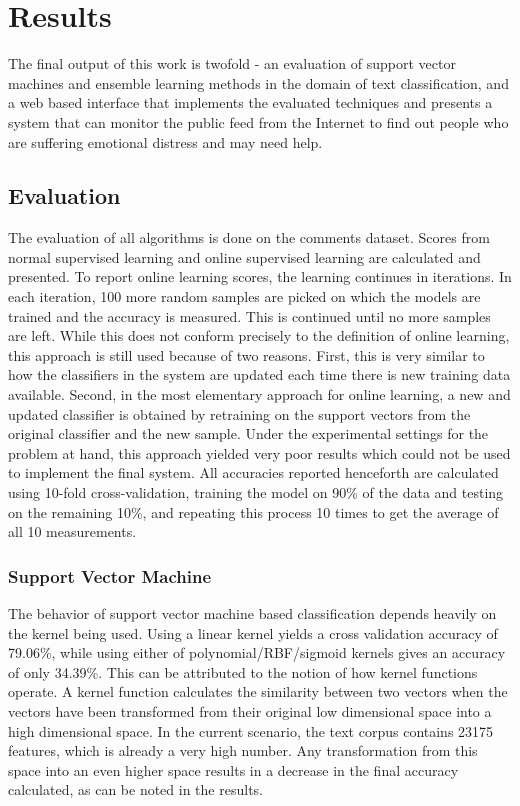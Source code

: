 \chapter{Results}
\label{chapter:Results}

The final output of this work is twofold - an evaluation of support vector machines and ensemble learning methods in the domain of text classification, and a web based interface that implements the evaluated techniques and presents a system that can monitor the public feed from the Internet to find out people who are suffering emotional distress and may need help.

\section{Evaluation}
\label{section:evaluation}
The evaluation of all algorithms is done on the comments dataset. Scores from normal supervised learning and online supervised learning are calculated and presented. To report online learning scores, the learning continues in iterations. In each iteration, 100 more random samples are picked on which the models are trained and the accuracy is measured. This is continued until no more samples are left. While this does not conform precisely to the definition of online learning, this approach is still used because of two reasons. First, this is very similar to how the classifiers in the system are updated each time there is new training data available. Second, in the most elementary approach for online learning, a new and updated classifier is obtained by retraining on the support vectors from the original classifier and the new sample. Under the experimental settings for the problem at hand, this approach yielded very poor results which could not be used to implement the final system. All accuracies reported henceforth are calculated using 10-fold cross-validation, training the model on 90\% of the data and testing on the remaining 10\%, and repeating this process 10 times to get the average of all 10 measurements.

\subsection{Support Vector Machine}
The behavior of support vector machine based classification depends heavily on the kernel being used. Using a linear kernel yields a cross validation accuracy of 79.06\%, while using either of polynomial/RBF/sigmoid kernels gives an accuracy of only 34.39\%. This can be attributed to the notion of how kernel functions operate. A kernel function calculates the similarity between two vectors when the vectors have been transformed from their original low dimensional space into a high dimensional space. In the current scenario, the text corpus contains 23175 features, which is already a very high number. Any transformation from this space into an even higher space results in a decrease in the final accuracy calculated, as can be noted in the results.\\

